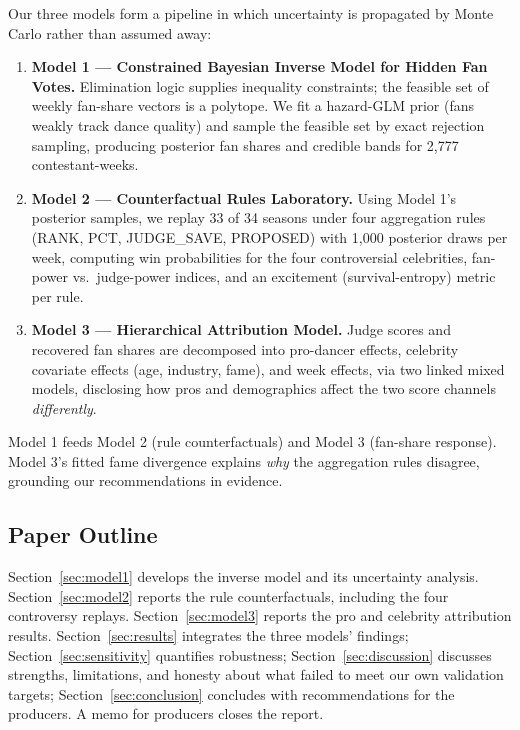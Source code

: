 \documentclass[11pt]{article}
\begin{document}
Our three models form a pipeline in which uncertainty is propagated by
Monte Carlo rather than assumed away:

\begin{enumerate}
\item \textbf{Model 1 --- Constrained Bayesian Inverse Model for Hidden Fan
Votes.} Elimination logic supplies inequality constraints; the feasible set
of weekly fan-share vectors is a polytope. We fit a hazard-GLM prior
(fans weakly track dance quality) and sample the feasible set by exact
rejection sampling, producing posterior fan shares and credible bands for
2{,}777 contestant-weeks.
\item \textbf{Model 2 --- Counterfactual Rules Laboratory.} Using Model 1's
posterior samples, we replay 33 of 34 seasons under four aggregation rules
(RANK, PCT, JUDGE\_SAVE, PROPOSED) with 1{,}000 posterior draws per week,
computing win probabilities for the four controversial celebrities,
fan-power vs.\ judge-power indices, and an excitement (survival-entropy)
metric per rule.
\item \textbf{Model 3 --- Hierarchical Attribution Model.} Judge scores and
recovered fan shares are decomposed into pro-dancer effects, celebrity
covariate effects (age, industry, fame), and week effects, via two linked
mixed models, disclosing how pros and demographics affect the two score
channels \emph{differently}.
\end{enumerate}

Model 1 feeds Model 2 (rule counterfactuals) and Model 3 (fan-share
response). Model 3's fitted fame divergence explains \emph{why} the
aggregation rules disagree, grounding our recommendations in evidence.

\subsection{Paper Outline}

Section~\ref{sec:model1} develops the inverse model and its uncertainty
analysis. Section~\ref{sec:model2} reports the rule counterfactuals,
including the four controversy replays. Section~\ref{sec:model3} reports
the pro and celebrity attribution results. Section~\ref{sec:results}
integrates the three models' findings; Section~\ref{sec:sensitivity}
quantifies robustness; Section~\ref{sec:discussion} discusses strengths,
limitations, and honesty about what failed to meet our own validation
targets; Section~\ref{sec:conclusion} concludes with recommendations for
the producers. A memo for producers closes the report.
\end{document}
